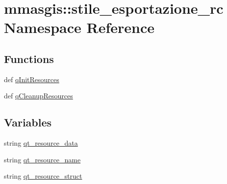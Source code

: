 \hypertarget{namespacemmasgis_1_1stile__esportazione__rc}{
\section{mmasgis::stile\_\-esportazione\_\-rc Namespace Reference}
\label{namespacemmasgis_1_1stile__esportazione__rc}
}
\subsection*{Functions}
\begin{DoxyCompactItemize}
\item 
def \hyperlink{namespacemmasgis_1_1stile__esportazione__rc_a84c77314b3dcf3d2bdb8fe413d859e4e}{qInitResources}
\item 
def \hyperlink{namespacemmasgis_1_1stile__esportazione__rc_af2eefe476d106dbc42574f52cebe405a}{qCleanupResources}
\end{DoxyCompactItemize}
\subsection*{Variables}
\begin{DoxyCompactItemize}
\item 
string \hyperlink{namespacemmasgis_1_1stile__esportazione__rc_a53ddf8b65ee7c742dc6b4ba5b4cb2410}{qt\_\-resource\_\-data}
\item 
string \hyperlink{namespacemmasgis_1_1stile__esportazione__rc_a67f042aea768d6a7378dbee94ed1d487}{qt\_\-resource\_\-name}
\item 
string \hyperlink{namespacemmasgis_1_1stile__esportazione__rc_a2b1e15df35fa24d9874a32ae7935f458}{qt\_\-resource\_\-struct}
\end{DoxyCompactItemize}


